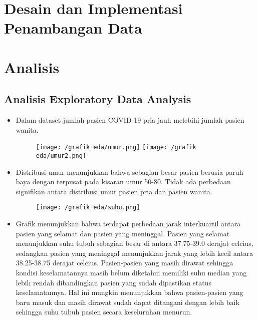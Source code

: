 \documentclass{article}
\begin{document}
   	
   \section{Desain dan Implementasi Penambangan Data}
   \section{Analisis}
    \subsection{Analisis Exploratory Data Analysis}
     \begin{itemize}
     	
	    \begin{figure}[H]
	    	\centering
	    	\texttt{[image: /grafik eda/gender.png]}
	    \end{figure}
    	\item Dalam dataset jumlah pasien COVID-19 pria jauh melebihi jumlah pasien wanita.
    	
		\begin{figure}[H]
			\centering
			\texttt{[image: /grafik eda/umur.png]}
			\texttt{[image: /grafik eda/umur2.png]}
		\end{figure}
		\item Distribusi umur menunjukkan bahwa sebagian besar pasien berusia paruh baya dengan terpusat pada kisaran umur 50-80. Tidak ada perbedaan signifikan antara distribusi umur pasien pria dan pasien wanita.
		
		\begin{figure}[H]
			\centering
			\texttt{[image: /grafik eda/suhu.png]}
		\end{figure}
		\item Grafik menunjukkan bahwa terdapat perbedaan jarak interkuartil antara pasien yang selamat dan pasien yang meninggal. Pasien yang selamat menunjukkan suhu tubuh sebagian besar di antara 37.75-39.0 derajat celcius, sedangkan pasien yang meninggal menunjukkan jarak yang lebih kecil antara 38.25-38.75 derajat celcius. Pasien-pasien yang masih dirawat sehingga kondisi keselamatannya masih belum diketahui memiliki suhu median yang lebih rendah dibandingkan pasien yang sudah dipastikan status keselamatannya. Hal ini mungkin menunjukkan bahwa pasien-pasien yang baru masuk dan masih dirawat sudah dapat ditangani dengan lebih baik sehingga suhu tubuh pasien secara keseluruhan menurun.
		

\end{itemize}
\end{document}
